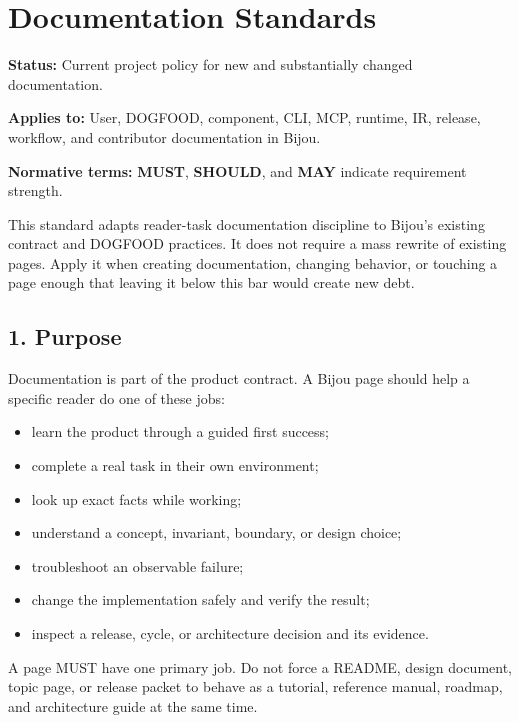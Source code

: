 \chapter{Documentation Standards}\label{record-005}

\smallskip

\textbf{Status:} Current project policy for new and substantially changed documentation.

\textbf{Applies to:} User, DOGFOOD, component, CLI, MCP, runtime, IR, release, workflow, and contributor documentation in Bijou.

\textbf{Normative terms:} \textbf{MUST}, \textbf{SHOULD}, and \textbf{MAY} indicate requirement strength.

This standard adapts reader-task documentation discipline to Bijou's existing contract and DOGFOOD practices. It does not require a mass rewrite of existing pages. Apply it when creating documentation, changing behavior, or touching a page enough that leaving it below this bar would create new debt.

\section{1. Purpose}\label{record-005-purpose}

Documentation is part of the product contract. A Bijou page should help a specific reader do one of these jobs:

\begin{itemize}
\tightlist
\item
  learn the product through a guided first success;
\item
  complete a real task in their own environment;
\item
  look up exact facts while working;
\item
  understand a concept, invariant, boundary, or design choice;
\item
  troubleshoot an observable failure;
\item
  change the implementation safely and verify the result;
\item
  inspect a release, cycle, or architecture decision and its evidence.
\end{itemize}

A page MUST have one primary job. Do not force a README, design document, topic page, or release packet to behave as a tutorial, reference manual, roadmap, and architecture guide at the same time.

